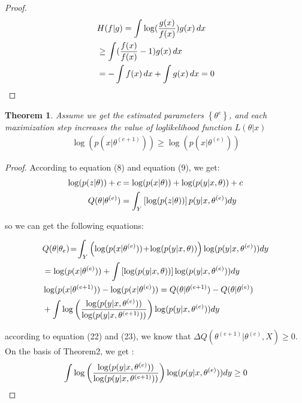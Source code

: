 \documentclass[conference]{IEEEtran}
\newtheorem{theorem}{Theorem}
\begin{document}
\begin{proof}
\begin{align}
    &H(f|g) = \int \log (\frac{g(x)}{f(x)}) g(x) \,dx \notag \\
    & \ge \int (\frac{f(x)}{f(x)}-1)g(x) \,dx   \notag \\
    & = -\int f(x) \,dx + \int g(x) \,dx = 0
\end{align}
\end{proof} 
\begin{theorem}
Assume we get the estimated parameters $\left\{\theta^{e} \right\}$, 
and each maximization step increases the value of loglikelihood function $L(\theta|x)$
\begin{align}
    \log (p(x|\theta^{(e+1)})) \ge \log(p(x|\theta^{(e)}))
\end{align}
\end{theorem}

\begin{proof}
According to equation (8) and equation (9), we get:
    \begin{align}
    \log (p(z|\theta)) + c &= \log (p(x|\theta)) + \log(p(y|x,\theta)) + c \notag \\
    Q(\theta|\theta^{(e)}) &= \int_{Y} \left[\log(p(z|\theta))\right]p(y|x,\theta^{(e)}) d y \notag
    \end{align}

so we can get the following equations:
\begin{small}
    \begin{align} 
   & Q(\theta|\theta_{e})\! =  \! \int_{Y}\left(\log(p(x|\theta^{(e)}))\!+\!\log(p(y|x,\theta))\right) 
    \log(p(y|x,\theta^{(e)})) d y \notag\\
   & =\log(p(x|\theta^{(e)}))+\int\left[\log(p(y|x,\theta))\right] \log(p(y|x,\theta^{(e)}))d y \notag \\
   & \log(p(x|\theta^{(e+1)})) - \log(p(x|\theta^{(e)})) = Q(\theta|\theta^{(e+1)})-Q(\theta|\theta^{(e)}) \notag \\
   &  + \int \log \left(\frac{\log(p(y|x,\theta^{(e)}))}{\log(p(y|x,\theta^{(e+1)}))}\right) \log(p(y|x,\theta^{(e)})) d y 
    \end{align}
\end{small}
according to equation (22) and (23), we know that $\Delta Q(\theta^{(e+1)}|\theta^{(e)},X) \ge 0$. 
On the basis of Theorem2, we get :
    \begin{align}
    \int \log \left(\frac{\log(p(y|x,\theta^{(e)}))}{\log(p(y|x,\theta^{(e+1)}))}\right) \log(p(y|x,\theta^{(e)})) d y \ge 0 \notag \\
    \end{align}
\end{proof}
\end{document}
